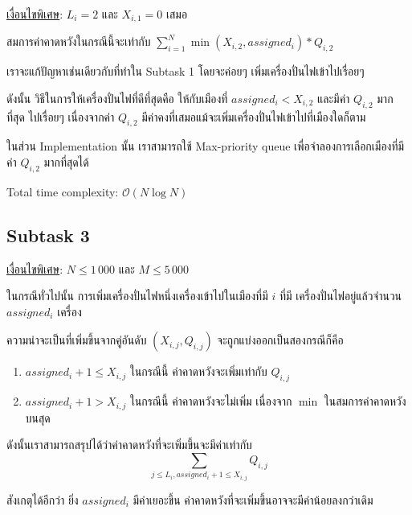\documentclass[12pt]{article}
\begin{document}
\underline{เงื่อนไขพิเศษ}: $L_i=2$ และ $X_{i,1}=0$ เสมอ

สมการค่าคาดหวังในกรณีนี้จะเท่ากับ $\sum_{i=1}^{N} \min(X_{i,2},assigned_i) * Q_{i,2}$

เราจะแก้ปัญหาเช่นเดียวกับที่ทำใน Subtask 1 โดยจะค่อยๆ เพิ่มเครื่องปั่นไฟเข้าไปเรื่อยๆ


ดังนั้น วิธีในการให้เครื่องปั่นไฟที่ดีที่สุดคือ ให้กับเมืองที่ $assigned_i < X_{i,2}$ และมีค่า $Q_{i,2}$ มากที่สุด ไปเรื่อยๆ เนื่องจากค่า $Q_{i,2}$ มีค่าคงที่เสมอแม้จะเพิ่มเครื่องปั่นไฟเข้าไปที่เมืองใดก็ตาม

ในส่วน Implementation นั้น เราสามารถใช้ Max-priority queue เพื่อจำลองการเลือกเมืองที่มีค่า $Q_{i, 2}$ มากที่สุดได้

Total time complexity: $\mathcal{O}(N \log N)$

\subsection{Subtask 3}

\underline{เงื่อนไขพิเศษ}: $N \leq 1\,000$ และ $M \leq 5\,000$

ในกรณีทั่วไปนั้น การเพิ่มเครื่องปั่นไฟหนึ่งเครื่องเข้าไปในเมืองที่มี $i$ ที่มี เครื่องปั่นไฟอยู่แล้วจำนวน $assigned_i$ เครื่อง

ความน่าจะเป็นที่เพิ่มขึ้นจากคู่อันดับ $(X_{i,j}, Q_{i,j})$ จะถูกแบ่งออกเป็นสองกรณีก็คือ

\begin{enumerate}
  \item $assigned_i+1 \leq X_{i,j}$ ในกรณีนี้ ค่าคาดหวังจะเพิ่มเท่ากับ $Q_{i,j}$
  \item $assigned_i+1 > X_{i,j}$ ในกรณีนี้ ค่าคาดหวังจะไม่เพิ่ม เนื่องจาก $\min$ ในสมการค่าคาดหวังบนสุด
\end{enumerate}

ดังนั้นเราสามารถสรุปได้ว่าค่าคาดหวังที่จะเพิ่มขึ้นจะมีค่าเท่ากับ $$\sum_{j \leq L_i, assigned_i+1 \leq X_{i,j}} Q_{i,j}$$

สังเกตุได้อีกว่า ยิ่ง $assigned_i$ มีค่าเยอะขึ้น ค่าคาดหวังที่จะเพิ่มขึ้นอาจจะมีค่าน้อยลงกว่าเดิม

\end{document}
